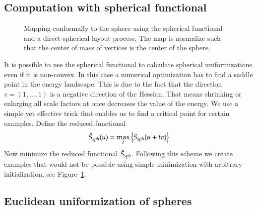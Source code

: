 \documentclass[Thesis]{subfiles}
\begin{document}
\subsection{Computation with spherical functional}

\begin{figure}
\centering
{}
\quad\quad\quad{}
\caption{Mapping conformally to the sphere using the spherical functional and a direct spherical layout process. The map is normalize such that the center of mass of vertices is the center of the sphere.}
\label{fig:spherical_examples}
\end{figure}

It is possible to use the spherical functional to calculate spherical uniformizations even if it is non-convex. In this case a numerical optimization has to find a saddle point in the energy landscape. This is due to the fact that the direction $v=(1,\ldots,1)$ is a negative direction of the Hessian. That means shrinking or enlarging all scale factors at once decreases the value of the energy. We use a simple yet effective trick that enables us to find a critical point for certain examples. Define the reduced functional
\begin{equation}
\label{eq:reduced_spherical}
\tilde S_{\it sph}(u)=\max_t \left\{S_{\it sph}(u + tv)\right\}
\end{equation}
Now minimize the reduced functional $\tilde  S_{\it sph}$. 
Following this scheme we create examples that would not be possible using simple minimization with arbitrary initialization, see Figure~\ref{fig:spherical_examples}.

\subsection{Euclidean uniformization of spheres}
\end{document}
